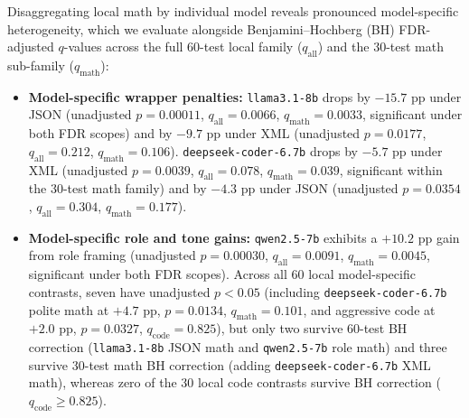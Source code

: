 \documentclass[a4paper,fleqn]{cas-sc}
\providecommand{\tightlist}{%
  \setlength{\itemsep}{0pt}\setlength{\parskip}{0pt}}
\begin{document}
Disaggregating local math by individual model reveals pronounced model-specific heterogeneity, which we evaluate alongside Benjamini--Hochberg (BH) FDR-adjusted $q$-values across the full 60-test local family ($q_{\text{all}}$) and the 30-test math sub-family ($q_{\text{math}}$):
\begin{itemize}
\tightlist
\item \textbf{Model-specific wrapper penalties:} \texttt{llama3.1-8b} drops by $-15.7$ pp under JSON (unadjusted $p = 0.00011$, $q_{\text{all}} = 0.0066$, $q_{\text{math}} = 0.0033$, significant under both FDR scopes) and by $-9.7$ pp under XML (unadjusted $p = 0.0177$, $q_{\text{all}} = 0.212$, $q_{\text{math}} = 0.106$). \texttt{deepseek-coder-6.7b} drops by $-5.7$ pp under XML (unadjusted $p = 0.0039$, $q_{\text{all}} = 0.078$, $q_{\text{math}} = 0.039$, significant within the 30-test math family) and by $-4.3$ pp under JSON (unadjusted $p = 0.0354$, $q_{\text{all}} = 0.304$, $q_{\text{math}} = 0.177$).
\item \textbf{Model-specific role and tone gains:} \texttt{qwen2.5-7b} exhibits a $+10.2$ pp gain from role framing (unadjusted $p = 0.00030$, $q_{\text{all}} = 0.0091$, $q_{\text{math}} = 0.0045$, significant under both FDR scopes). Across all 60 local model-specific contrasts, seven have unadjusted $p < 0.05$ (including \texttt{deepseek-coder-6.7b} polite math at $+4.7$ pp, $p = 0.0134$, $q_{\text{math}} = 0.101$, and aggressive code at $+2.0$ pp, $p = 0.0327$, $q_{\text{code}} = 0.825$), but only two survive 60-test BH correction (\texttt{llama3.1-8b} JSON math and \texttt{qwen2.5-7b} role math) and three survive 30-test math BH correction (adding \texttt{deepseek-coder-6.7b} XML math), whereas zero of the 30 local code contrasts survive BH correction ($q_{\text{code}} \ge 0.825$).
\end{itemize}
\end{document}
